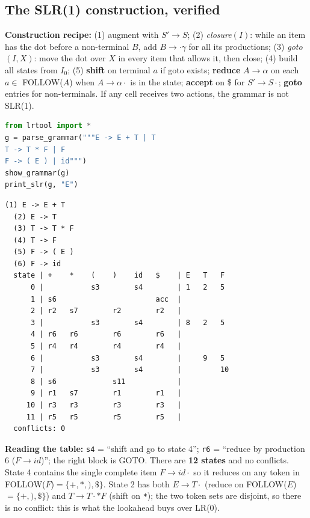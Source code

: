 \documentclass[10pt,a4paper,openany,oneside]{report}
\begin{document}
\subsection{The SLR(1) construction, verified}
\textbf{Construction recipe:} (1) augment with $S'\to S$; (2) \emph{closure}$(I)$: while an item has the dot before a non-terminal $B$, add $B\to\cdot\gamma$ for all its productions; (3) \emph{goto}$(I,X)$: move the dot over $X$ in every item that allows it, then close; (4) build all states from $I_0$; (5) \textbf{shift} on terminal $a$ if goto exists; \textbf{reduce} $A\to\alpha$ on each $a\in$ FOLLOW($A$) when $A\to\alpha\cdot$ is in the state; \textbf{accept} on \$ for $S'\to S\cdot$; \textbf{goto} entries for non-terminals. If any cell receives two actions, the grammar is not SLR(1).
\begin{lstlisting}[language={Python},title={SLR(1) table for  E -> E+T | T ;  T -> T*F | F ;  F -> (E) | id}]
from lrtool import *
g = parse_grammar("""E -> E + T | T
T -> T * F | F
F -> ( E ) | id""")
show_grammar(g)
print_slr(g, "E")
\end{lstlisting}
\begin{lstlisting}[style=out,title={Captured output}]
  (1) E -> E + T
  (2) E -> T
  (3) T -> T * F
  (4) T -> F
  (5) F -> ( E )
  (6) F -> id
  state | +    *    (    )    id   $    | E   T   F  
      0 |           s3        s4        | 1   2   5  
      1 | s6                       acc  |            
      2 | r2   s7        r2        r2   |            
      3 |           s3        s4        | 8   2   5  
      4 | r6   r6        r6        r6   |            
      5 | r4   r4        r4        r4   |            
      6 |           s3        s4        |     9   5  
      7 |           s3        s4        |         10 
      8 | s6             s11            |            
      9 | r1   s7        r1        r1   |            
     10 | r3   r3        r3        r3   |            
     11 | r5   r5        r5        r5   |            
  conflicts: 0
\end{lstlisting}
\textbf{Reading the table:} \texttt{s4} = ``shift and go to state 4''; \texttt{r6} = ``reduce by production 6 ($F\to\textit{id}$)''; the right block is GOTO. There are \textbf{12 states} and no conflicts. State 4 contains the single complete item $F\to\textit{id}\cdot$ so it reduces on any token in FOLLOW($F$)$=\{+,*,),\$\}$. State 2 has both $E\to T\cdot$ (reduce on FOLLOW($E$)$=\{+,),\$\}$) and $T\to T\cdot{*}F$ (shift on \texttt{*}); the two token sets are disjoint, so there is no conflict: this is what the lookahead buys over LR(0).
\end{document}
